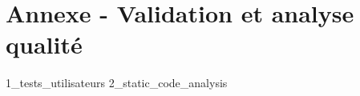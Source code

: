\section{Annexe - Validation et analyse qualité} \label{sec:annexes_c}

{1_tests_utilisateurs}
{2_static_code_analysis}
